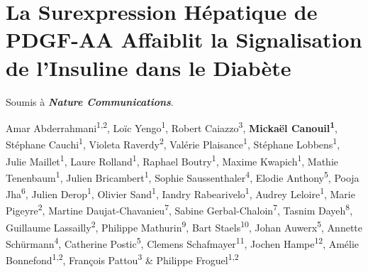 \documentclass[11pt,a4paper,notrimn]{krantz}
\theoremstyle{definition}
\theoremstyle{definition}
\theoremstyle{remark}
\begin{document}
\chapter{La Surexpression Hépatique de PDGF-AA Affaiblit la
Signalisation de l'Insuline dans le Diabète}\label{Article3}

Soumis à \textbf{\emph{Nature Communications}}.

Amar Abderrahmani\textsuperscript{1,2\textasteriskcentered}, Loïc
Yengo\textsuperscript{1\textasteriskcentered}, Robert
Caiazzo\textsuperscript{3\textasteriskcentered}, \textbf{Mickaël
Canouil\textsuperscript{1\textasteriskcentered}}, Stéphane
Cauchi\textsuperscript{1}, Violeta Raverdy\textsuperscript{2}, Valérie
Plaisance\textsuperscript{1}, Stéphane Lobbens\textsuperscript{1}, Julie
Maillet\textsuperscript{1}, Laure Rolland\textsuperscript{1}, Raphael
Boutry\textsuperscript{1}, Maxime Kwapich\textsuperscript{1}, Mathie
Tenenbaum\textsuperscript{1}, Julien Bricambert\textsuperscript{1},
Sophie Saussenthaler\textsuperscript{4}, Elodie
Anthony\textsuperscript{5}, Pooja Jha\textsuperscript{6}, Julien
Derop\textsuperscript{1}, Olivier Sand\textsuperscript{1}, Iandry
Rabearivelo\textsuperscript{1}, Audrey Leloire\textsuperscript{1}, Marie
Pigeyre\textsuperscript{2}, Martine Daujat-Chavanieu\textsuperscript{7},
Sabine Gerbal-Chaloin\textsuperscript{7}, Tasnim
Dayeh\textsuperscript{8}, Guillaume Lassailly\textsuperscript{2},
Philippe Mathurin\textsuperscript{9}, Bart Staels\textsuperscript{10},
Johan Auwerx\textsuperscript{5}, Annette Schürmann\textsuperscript{4},
Catherine Postic\textsuperscript{5}, Clemens
Schafmayer\textsuperscript{11}, Jochen Hampe\textsuperscript{12}, Amélie
Bonnefond\textsuperscript{1,2}, François
Pattou\textsuperscript{3\textdagger} \& Philippe
Froguel\textsuperscript{1,2\textdagger}
\end{document}

